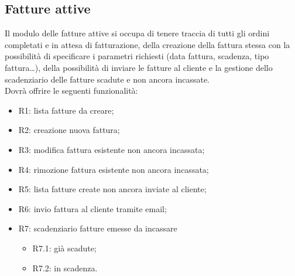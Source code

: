 	\subsection{Fatture attive}
	Il modulo delle fatture attive si occupa di tenere traccia di tutti gli ordini completati e in attesa
	di fatturazione, della creazione della fattura stessa con la possibilità di specificare i parametri
	richiesti (data fattura, scadenza, tipo fattura…), della possibilità di inviare le fatture al cliente e
	la gestione dello scadenziario delle fatture scadute e non ancora incassate.\\
	Dovrà offrire le seguenti funzionalità:
	\begin{itemize}
		\item R1: lista fatture da creare;
		\item R2: creazione nuova fattura;
		\item R3: modifica fattura esistente non ancora incassata;
		\item R4: rimozione fattura esistente non ancora incassata;
		\item R5: lista fatture create non ancora inviate al cliente;
		\item R6: invio fattura al cliente tramite email;
		\item R7: scadenziario fatture emesse da incassare
		\begin{itemize}
			\item R7.1: già scadute;
			\item R7.2: in scadenza.
		\end{itemize}
	\end{itemize}
	
	
